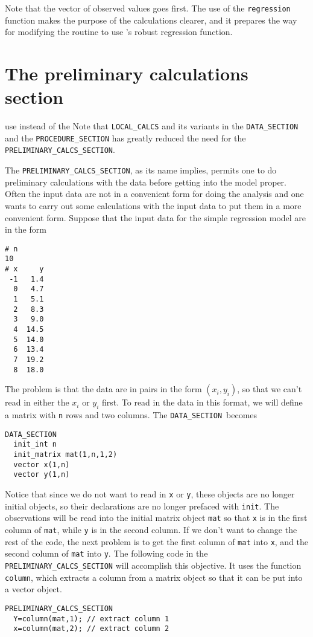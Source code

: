 \documentclass{admbmanual}
\newcommand\DS{\texttt{DATA\_SECTION}}
\begin{document}
Note that the vector of observed values goes first. The use of the
\texttt{regression} function makes the purpose of the calculations clearer, and
it prepares the way for modifying the routine to use \ADM's robust regression
function.

\section{The preliminary calculations section}

%
{use instead of the }
Note that \texttt{LOCAL\_CALCS} and its variants in the \texttt{DATA\_SECTION}
and the \texttt{PROCEDURE\_SECTION} has greatly reduced the need for the
\texttt{PRELIMINARY\_CALCS\_SECTION}.

The \texttt{PRELIMINARY\_CALCS\_SECTION}, as its name implies, permits one to do
preliminary calculations with the data before getting into the model proper.
Often the input data are not in a convenient form for doing the analysis and one
wants to carry out some calculations with the input data to put them in a more
convenient form. Suppose that the input data for the simple regression model are
in the form
\begin{lstlisting}
# n
10
# x     y
 -1   1.4
  0   4.7
  1   5.1
  2   8.3
  3   9.0
  4  14.5
  5  14.0
  6  13.4
  7  19.2
  8  18.0
\end{lstlisting}
The problem is that the data are in pairs in the form $(x_i,y_i)$, so that we
can't read in either the $x_i$ or $y_i$ first. To read in the data in this
format, we will define a matrix with \texttt{n} rows and two columns. The
\DS\ becomes
\begin{lstlisting}
DATA_SECTION
  init_int n
  init_matrix mat(1,n,1,2)
  vector x(1,n)
  vector y(1,n)
\end{lstlisting}
Notice that since we do not want to read in \texttt{x} or \texttt{y}, these
objects are no longer initial objects, so their declarations are no longer
prefaced with \texttt{init}. The observations will be read into the initial
matrix object \texttt{mat} so that \texttt{x} is in the first column of
\texttt{mat}, while \texttt{y} is in the second column. If we don't want to
change the rest of the code, the next problem is to get the first column of
\texttt{mat} into \texttt{x}, and the second column of \texttt{mat} into
\texttt{y}. The following code in the \texttt{PRELIMINARY\_CALCS\_SECTION} will
accomplish this objective. It uses the function \texttt{column}, which extracts
a column from a matrix object so that it can be put into a vector object.
\begin{lstlisting}
PRELIMINARY_CALCS_SECTION
  Y=column(mat,1); // extract column 1
  x=column(mat,2); // extract column 2
\end{lstlisting}
\end{document}

